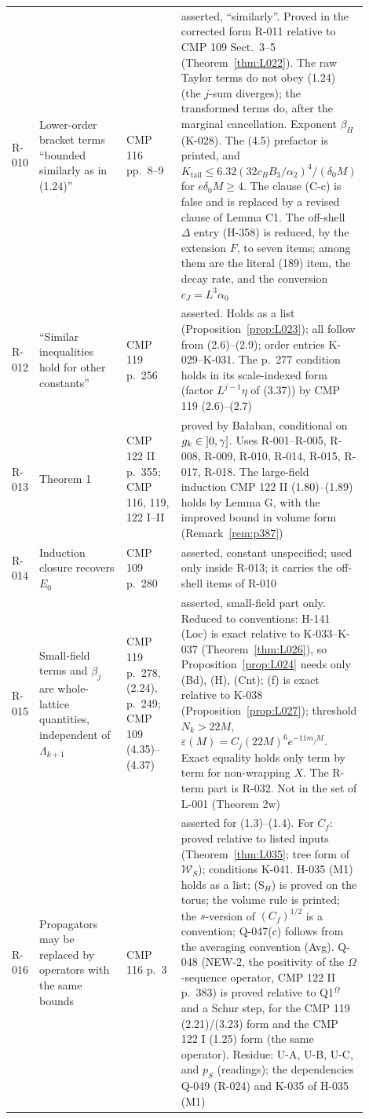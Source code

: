 {\begin{longtable}{p{0.05\linewidth}p{0.33\linewidth}p{0.2\linewidth}p{0.32\linewidth}}
R-010 & Lower-order bracket terms ``bounded similarly as in (1.24)'' & CMP 116 pp.\ 8--9 & asserted, ``similarly''. Proved in the corrected form R-011 relative to CMP 109 Sect.\ 3--5 (Theorem~\ref{thm:L022}). The raw Taylor terms do not obey (1.24) (the $j$-sum diverges); the transformed terms do, after the marginal cancellation. Exponent $\beta_H$ (K-028). The (4.5) prefactor is printed, and $K_{\mathrm{tail}}\le6.32(32c_BB_3/\alpha_2)^4/(\delta_0M)$ for $e\delta_0M\ge4$. The clause (C-c) is false and is replaced by a revised clause of Lemma C1. The off-shell $\Delta$ entry (H-358) is reduced, by the extension $F$, to seven items; among them are the literal (189) item, the decay rate, and the conversion $c_J=L^3\alpha_0$ \\
R-012 & ``Similar inequalities hold for other constants'' & CMP 119 p.\ 256 & asserted. Holds as a list (Proposition~\ref{prop:L023}); all follow from (2.6)--(2.9); order entries K-029--K-031. The p.~277 condition holds in its scale-indexed form (factor $L^{j-1}\eta$ of (3.37)) by CMP 119 (2.6)--(2.7) \\
R-013 & Theorem 1 & CMP 122 II p.\ 355; CMP 116, 119, 122 I--II & proved by Ba{\l}aban, conditional on $g_k\in\mathopen{]}0,\gamma\mathclose{]}$. Uses R-001--R-005, R-008, R-009, R-010, R-014, R-015, R-017, R-018. The large-field induction CMP 122 II (1.80)--(1.89) holds by Lemma G, with the improved bound in volume form (Remark~\ref{rem:p387}) \\
R-014 & Induction closure recovers $E_0$ & CMP 109 p.\ 280 & asserted, constant unspecified; used only inside R-013; it carries the off-shell items of R-010 \\
R-015 & Small-field terms and $\beta_j$ are whole-lattice quantities, independent of $\Lambda_{k+1}$ & CMP 119 p.\ 278, (2.24), p.\ 249; CMP 109 (4.35)--(4.37) & asserted, small-field part only. Reduced to conventions: H-141 (Loc) is exact relative to K-033--K-037 (Theorem~\ref{thm:L026}), so Proposition~\ref{prop:L024} needs only (Bd), (H), (Cnt); (f) is exact relative to K-038 (Proposition~\ref{prop:L027}); threshold $N_k>22M$, $\varepsilon(M)=C_j(22M)^6e^{-11m_jM}$. Exact equality holds only term by term for non-wrapping $X$. The R-term part is R-032. Not in the set of L-001 (Theorem 2w) \\
R-016 & Propagators may be replaced by operators with the same bounds & CMP 116 p.\ 3 & asserted for (1.3)--(1.4). For $C_f$: proved relative to listed inputs (Theorem~\ref{thm:L035}; tree form of $\mathcal W_S$); conditions K-041. H-035 (M1) holds as a list; (S$_H$) is proved on the torus; the volume rule is printed; the $s$-version of $(C_f)^{1/2}$ is a convention; Q-047(c) follows from the averaging convention (Avg). Q-048 (NEW-2, the positivity of the $\Omega$-sequence operator, CMP 122 II p.~383) is proved relative to Q1$^\Omega$ and a Schur step, for the CMP 119 (2.21)/(3.23) form and the CMP 122 I (1.25) form (the same operator). Residue: U-A, U-B, U-C, and $p_S$ (readings); the dependencies Q-049 (R-024) and K-035 of H-035 (M1) \\

\end{longtable}}
